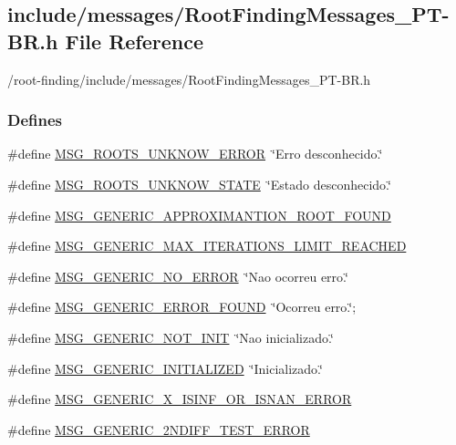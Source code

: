 \hypertarget{RootFindingMessages__PT-BR_8h}{
\subsection{include/messages/RootFindingMessages\_\-PT-BR.h File Reference}
\label{RootFindingMessages__PT-BR_8h}
}
/root-finding/include/messages/RootFindingMessages\_\-PT-BR.h 

\subsubsection*{Defines}
\begin{CompactItemize}
\item 
\#define \hyperlink{group____messages_g9d5756daf9e0e99c65a2b72531a0b765}{MSG\_\-ROOTS\_\-UNKNOW\_\-ERROR}~\char`\"{}Erro desconhecido.\char`\"{}
\item 
\#define \hyperlink{group____messages_gf33ab54fcaa61fcc47cb9c5dece317e2}{MSG\_\-ROOTS\_\-UNKNOW\_\-STATE}~\char`\"{}Estado desconhecido.\char`\"{}
\item 
\#define \hyperlink{group____messages_g1cd065e37768f9ba5e945f01e5223149}{MSG\_\-GENERIC\_\-APPROXIMANTION\_\-ROOT\_\-FOUND}
\item 
\#define \hyperlink{group____messages_g07f4e1141d65130c4dad0a273735d81e}{MSG\_\-GENERIC\_\-MAX\_\-ITERATIONS\_\-LIMIT\_\-REACHED}
\item 
\#define \hyperlink{group____messages_gc4f8d165b6144573adc8ce2776826c49}{MSG\_\-GENERIC\_\-NO\_\-ERROR}~\char`\"{}Nao ocorreu erro.\char`\"{}
\item 
\#define \hyperlink{group____messages_g256cb6d156d41a9029016f3284a43a19}{MSG\_\-GENERIC\_\-ERROR\_\-FOUND}~\char`\"{}Ocorreu erro.\char`\"{};
\item 
\#define \hyperlink{group____messages_gb9e27a0fd9a540c07295263a8daa57e1}{MSG\_\-GENERIC\_\-NOT\_\-INIT}~\char`\"{}Nao inicializado.\char`\"{}
\item 
\#define \hyperlink{group____messages_g37731c9a9a8f20520f275e8cd3e75491}{MSG\_\-GENERIC\_\-INITIALIZED}~\char`\"{}Inicializado.\char`\"{}
\item 
\#define \hyperlink{group____messages_g00d31c81dbc7f971424196036c148a1a}{MSG\_\-GENERIC\_\-X\_\-ISINF\_\-OR\_\-ISNAN\_\-ERROR}
\item 
\#define \hyperlink{group____messages_gce1123edca28cb0b02531869093e7214}{MSG\_\-GENERIC\_\-2NDIFF\_\-TEST\_\-ERROR}

\end{CompactItemize}

